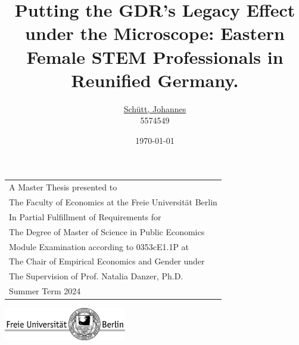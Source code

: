 \documentclass[a4paper, oneside, hyperfootnotes = false]{article}
\title{Putting the GDR's Legacy Effect under the Microscope: \linebreak Eastern Female STEM Professionals in Reunified Germany.}
\author{\href{mailto:johannes.schuett@fu-berlin.de}{Schütt, Johannes} \\
5574549}
\date{\today{}}
\begin{document}
{\fontsize{12pt}{18pt}\selectfont

\maketitle

\thispagestyle{empty}

\vspace{1.5cm}

\noindent\begin{tabular}{l}
	A Master Thesis presented to \\
	The Faculty of Economics at the Freie Universität Berlin \\
    [\normalbaselineskip]
    In Partial Fulfillment of Requirements for \\
    The Degree of Master of Science in Public Economics\\
    [\normalbaselineskip]
    Module Examination according to 0353cE1.1P at \\
    The Chair of Empirical Economics and Gender under \\
    The Supervision of Prof. Natalia Danzer, Ph.D. \\
    [\normalbaselineskip]
    Summer Term 2024
\end{tabular}

\vspace{3cm}

\begin{center}
    \includegraphics[width=0.4\textwidth, angle=0]{fu_logo.pdf}
\end{center}

\newpage

\pagestyle{plain}

{\fontsize{12pt}{15pt}\selectfont

\tableofcontents
\newpage

{}
\listoffigures

\vspace{2cm}

{}
\listoftables

\newpage

{}
}}
\end{document}
